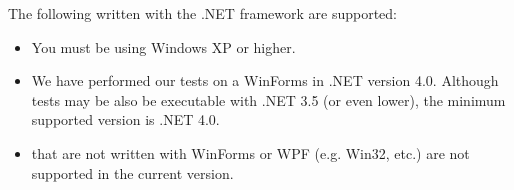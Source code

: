 The  following \gdauts{} written with the .NET framework are supported:

\begin{itemize}
\item You must be using Windows XP or higher.
\item We have performed our tests on a WinForms \gdaut{} in .NET version 4.0. Although tests may be also be executable with .NET 3.5 (or even lower), the minimum supported version is .NET 4.0.
\item \gdauts{} that are not written with WinForms or WPF (e.g. Win32, etc.) are not supported in the current version. 
\end{itemize}



